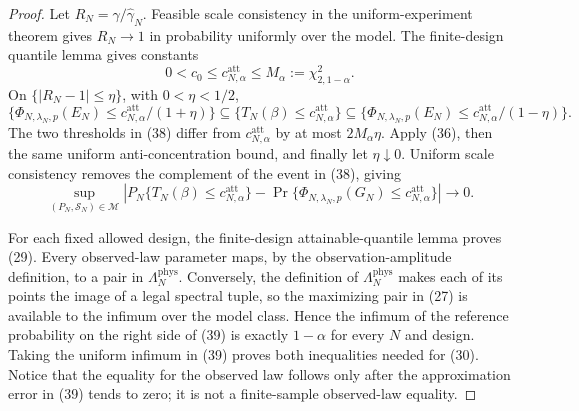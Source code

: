 \documentclass{article}
\begin{document}
\begin{proof}
Let \(R_N=\gamma/\widehat\gamma_N\).  Feasible scale consistency in the uniform-experiment theorem gives \(R_N\to1\) in probability uniformly over the model.  The finite-design quantile lemma gives constants
\[
0<c_0\le c_{N,\alpha}^{\mathrm{att}}\le M_\alpha:=\chi^2_{2,1-\alpha}.        \tag{37}
\]
On \(\{|R_N-1|\le\eta\}\), with \(0<\eta<1/2\),
\[
\{\Phi_{N,\lambda_N,p}(E_N)\le c_{N,\alpha}^{\mathrm{att}}/(1+\eta)\}
\subseteq\{T_N(\beta)\le c_{N,\alpha}^{\mathrm{att}}\}
\subseteq
\{\Phi_{N,\lambda_N,p}(E_N)\le c_{N,\alpha}^{\mathrm{att}}/(1-\eta)\}.     \tag{38}
\]
The two thresholds in (38) differ from \(c_{N,\alpha}^{\mathrm{att}}\) by at most \(2M_\alpha\eta\).  Apply (36), then the same uniform anti-concentration bound, and finally let \(\eta\downarrow0\).  Uniform scale consistency removes the complement of the event in (38), giving
\[
\sup_{(P_N,\mathcal S_N)\in\mathcal M}
\left|P_N\{T_N(\beta)\le c_{N,\alpha}^{\mathrm{att}}\}
-\Pr\{\Phi_{N,\lambda_N,p}(G_N)\le c_{N,\alpha}^{\mathrm{att}}\}\right|
\longrightarrow0.                                                            \tag{39}
\]

For each fixed allowed design, the finite-design attainable-quantile lemma proves (29).  Every observed-law parameter maps, by the observation-amplitude definition, to a pair in \(\Lambda_N^{\mathrm{phys}}\).  Conversely, the definition of \(\Lambda_N^{\mathrm{phys}}\) makes each of its points the image of a legal spectral tuple, so the maximizing pair in (27) is available to the infimum over the model class.  Hence the infimum of the reference probability on the right side of (39) is exactly \(1-\alpha\) for every \(N\) and design.  Taking the uniform infimum in (39) proves both inequalities needed for (30).  Notice that the equality for the observed law follows only after the approximation error in (39) tends to zero; it is not a finite-sample observed-law equality.


\end{proof}
\end{document}
